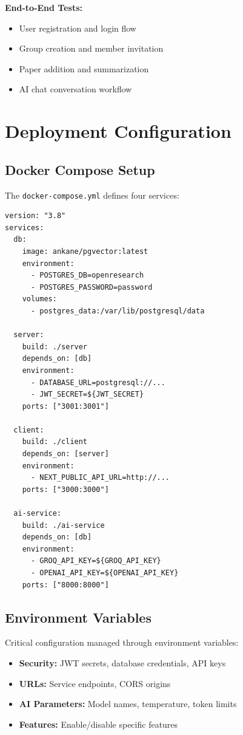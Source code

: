 \documentclass[12pt]{report}
\begin{document}
\textbf{End-to-End Tests:}
\begin{itemize}
    \item User registration and login flow
    \item Group creation and member invitation
    \item Paper addition and summarization
    \item AI chat conversation workflow
\end{itemize}

\section{Deployment Configuration}

\subsection{Docker Compose Setup}

The \texttt{docker-compose.yml} defines four services:

\begin{verbatim}
version: "3.8"
services:
  db:
    image: ankane/pgvector:latest
    environment:
      - POSTGRES_DB=openresearch
      - POSTGRES_PASSWORD=password
    volumes:
      - postgres_data:/var/lib/postgresql/data
    
  server:
    build: ./server
    depends_on: [db]
    environment:
      - DATABASE_URL=postgresql://...
      - JWT_SECRET=${JWT_SECRET}
    ports: ["3001:3001"]
    
  client:
    build: ./client
    depends_on: [server]
    environment:
      - NEXT_PUBLIC_API_URL=http://...
    ports: ["3000:3000"]
    
  ai-service:
    build: ./ai-service
    depends_on: [db]
    environment:
      - GROQ_API_KEY=${GROQ_API_KEY}
      - OPENAI_API_KEY=${OPENAI_API_KEY}
    ports: ["8000:8000"]
\end{verbatim}

\subsection{Environment Variables}

Critical configuration managed through environment variables:
\begin{itemize}
    \item \textbf{Security:} JWT secrets, database credentials, API keys
    \item \textbf{URLs:} Service endpoints, CORS origins
    \item \textbf{AI Parameters:} Model names, temperature, token limits
    \item \textbf{Features:} Enable/disable specific features
\end{itemize}
\end{document}
